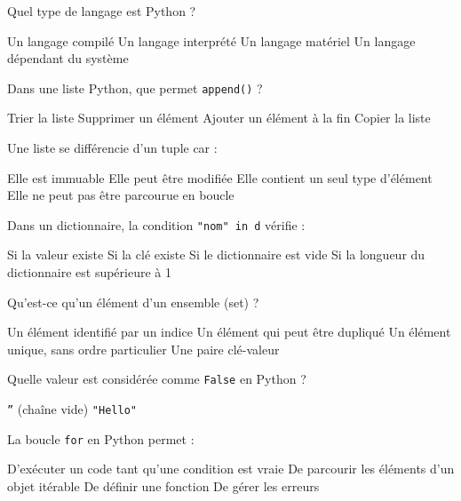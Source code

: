 \documentclass[11pt,a4paper]{exam}
\begin{document}
\begin{questions}

\question[1] Quel type de langage est Python ?
\begin{checkboxes}
  \choice Un langage compilé
  \choice Un langage interprété
  \choice Un langage matériel
  \choice Un langage dépendant du système
\end{checkboxes}

\question[1] Dans une liste Python, que permet \texttt{append()} ?
\begin{checkboxes}
  \choice Trier la liste
  \choice Supprimer un élément
  \choice Ajouter un élément à la fin
  \choice Copier la liste
\end{checkboxes}

\question[1] Une liste se différencie d'un tuple car :
\begin{checkboxes}
  \choice Elle est immuable
  \choice Elle peut être modifiée
  \choice Elle contient un seul type d’élément
  \choice Elle ne peut pas être parcourue en boucle
\end{checkboxes}

\question[1] Dans un dictionnaire, la condition \texttt{"nom" in d} vérifie :
\begin{checkboxes}
  \choice Si la valeur existe
  \choice Si la clé existe
  \choice Si le dictionnaire est vide
  \choice Si la longueur du dictionnaire est supérieure à 1
\end{checkboxes}

\question[1] Qu’est-ce qu’un élément d’un ensemble (set) ?
\begin{checkboxes}
  \choice Un élément identifié par un indice
  \choice Un élément qui peut être dupliqué
  \choice Un élément unique, sans ordre particulier
  \choice Une paire clé-valeur
\end{checkboxes}

\question[1] Quelle valeur est considérée comme \texttt{False} en Python ?
\begin{checkboxes}
  \choice \texttt{''} (chaîne vide)
  \choice \texttt{"Hello"}
\end{checkboxes}

\question[1] La boucle \texttt{for} en Python permet :
\begin{checkboxes}
  \choice D’exécuter un code tant qu’une condition est vraie
  \choice De parcourir les éléments d’un objet itérable
  \choice De définir une fonction
  \choice De gérer les erreurs
\end{checkboxes}
\newpage


\end{questions}
\end{document}
